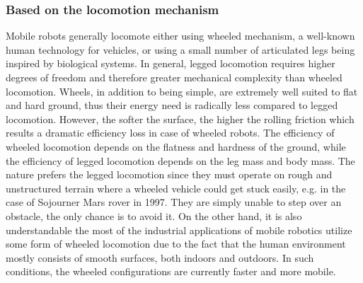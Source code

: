 \documentclass[12pt,english]{article}
\begin{document}
\subsubsection{Based on the locomotion mechanism}
Mobile robots generally locomote either using wheeled mechanism, a well-known human technology for vehicles, or using a small number of articulated legs being inspired by biological systems. In general, legged locomotion requires higher degrees of freedom and therefore greater mechanical complexity than wheeled locomotion. Wheels, in addition to being simple, are extremely well suited to flat and hard ground, thus their energy need is radically less compared to legged locomotion. However, the softer the surface, the higher the rolling friction which results a dramatic efficiency loss in case of wheeled robots. The efficiency of wheeled locomotion depends on the flatness and hardness of the ground, while the efficiency of legged locomotion depends on the leg mass and body mass. The nature prefers the legged locomotion since they must operate on rough and unstructured terrain where a wheeled vehicle could get stuck easily, e.g. in the case of Sojourner Mars rover in 1997. They are simply unable to step over an obstacle, the only chance is to avoid it.
On the other hand, it is also understandable the most of the industrial applications of mobile robotics utilize some form of wheeled locomotion due to the fact that the human environment mostly consists of smooth surfaces, both indoors and outdoors. In such conditions, the wheeled configurations are currently faster and more mobile.
\end{document}
